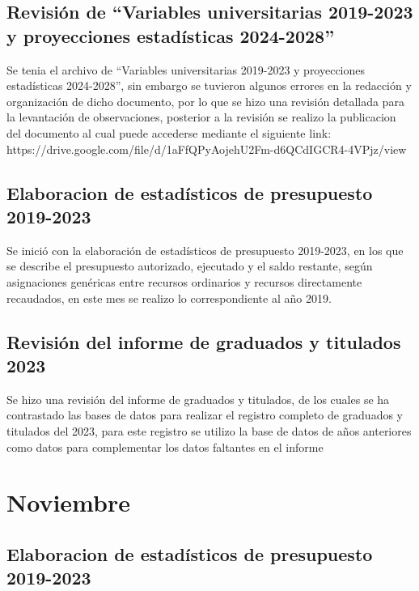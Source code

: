 \documentclass[
  12pt,
  letterpaper,
]{scrreprt}
\begin{document}
\subsection{Revisión de ``Variables universitarias 2019-2023 y
proyecciones estadísticas
2024-2028''}\label{revisiuxf3n-de-variables-universitarias-2019-2023-y-proyecciones-estaduxedsticas-2024-2028}

Se tenia el archivo de ``Variables universitarias 2019-2023 y
proyecciones estadísticas 2024-2028'', sin embargo se tuvieron algunos
errores en la redacción y organización de dicho documento, por lo que se
hizo una revisión detallada para la levantación de observaciones,
posterior a la revisión se realizo la publicacion del documento al cual
puede accederse mediante el siguiente link:
https://drive.google.com/file/d/1aFfQPyAojehU2Fm-d6QCdIGCR4-4VPjz/view

\subsection{Elaboracion de estadísticos de presupuesto
2019-2023}\label{elaboracion-de-estaduxedsticos-de-presupuesto-2019-2023}

Se inició con la elaboración de estadísticos de presupuesto 2019-2023,
en los que se describe el presupuesto autorizado, ejecutado y el saldo
restante, según asignaciones genéricas entre recursos ordinarios y
recursos directamente recaudados, en este mes se realizo lo
correspondiente al año 2019.

\subsection{Revisión del informe de graduados y titulados
2023}\label{revisiuxf3n-del-informe-de-graduados-y-titulados-2023}

Se hizo una revisión del informe de graduados y titulados, de los cuales
se ha contrastado las bases de datos para realizar el registro completo
de graduados y titulados del 2023, para este registro se utilizo la base
de datos de años anteriores como datos para complementar los datos
faltantes en el informe

\section{Noviembre}\label{noviembre}

\subsection{Elaboracion de estadísticos de presupuesto
2019-2023}\label{elaboracion-de-estaduxedsticos-de-presupuesto-2019-2023-1}
\end{document}
